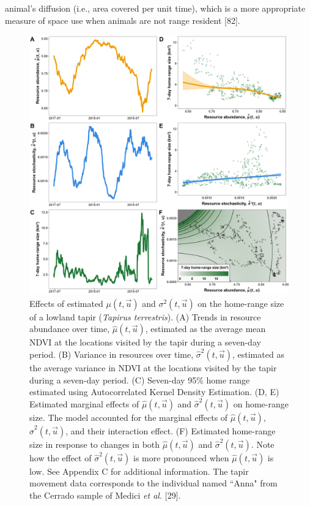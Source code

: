 \documentclass[
  12pt,
]{article}
\begin{document}
animal's diffusion (i.e., area covered per unit time), which is a more appropriate measure of space use when animals are not range resident {[}82{]}.

\begin{figure}

{\centering \includegraphics[width=1\linewidth]{../figures/tapir-example} 

}

\caption{Effects of estimated $\mu(t, \vec u)$ and $\sigma^2(t, \vec u)$ on the home-range size of a lowland tapir (\emph{Tapirus terrestris}). (A) Trends in resource abundance over time, $\hat\mu(t, \vec u)$, estimated as the average mean NDVI at the locations visited by the tapir during a seven-day period. (B) Variance in resources over time, $\hat\sigma^2(t, \vec u)$, estimated as the average variance in NDVI at the locations visited by the tapir during a seven-day period. (C) Seven-day 95\% home range estimated using Autocorrelated Kernel Density Estimation. (D, E) Estimated marginal effects of $\hat\mu(t, \vec u)$ and $\hat\sigma^2(t, \vec u)$ on home-range size. The model accounted for the marginal effects of $\hat\mu(t, \vec u)$, $\hat\sigma^2(t, \vec u)$, and their interaction effect. (F) Estimated home-range size in response to changes in both $\hat\mu(t, \vec u)$ and $\hat\sigma^2(t, \vec u)$. Note how the effect of $\hat\sigma^2(t, \vec u)$ is more pronounced when $\hat\mu(t, \vec u)$ is low. See Appendix C for additional information. The tapir movement data corresponds to the individual named ``Anna" from the Cerrado sample of Medici \emph{et al.} [29].}\label{fig:tapir-mw}
\end{figure}
\end{document}
